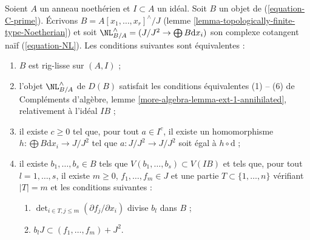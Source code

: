 \begin{lemma}
\label{lemma-equivalent-with-artin-smooth}
Soient $A$ un anneau noethérien et $I \subset A$ un idéal. Soit $B$ un objet
de (\ref{equation-C-prime}). Écrivons
$B = A[x_1, \ldots, x_r]^\wedge/J$
(lemme \ref{lemma-topologically-finite-type-Noetherian}) et soit
$\NL_{B/A}^\wedge = (J/J^2 \to \bigoplus B\text{d}x_i)$ son complexe
cotangent naïf (\ref{equation-NL}). Les conditions suivantes sont équivalentes :
\begin{enumerate}
\item $B$ est rig-lisse sur $(A, I)$ ;
\item l'objet $\NL_{B/A}^\wedge$ de $D(B)$ satisfait les conditions
équivalentes (1) -- (6) de Compléments d'algèbre, lemme
\ref{more-algebra-lemma-ext-1-annihilated}, relativement à l'idéal $IB$ ;
\item il existe $c \geq 0$ tel que, pour tout $a \in I^c$, il existe un
homomorphisme $h : \bigoplus B\text{d}x_i \to J/J^2$ tel que
$a : J/J^2 \to J/J^2$ soit égal à $h \circ \text{d}$ ;
\item il existe $b_1, \ldots, b_s \in B$ tels que
$V(b_1, \ldots, b_s) \subset V(IB)$ et tels que, pour tout
$l = 1, \ldots, s$, il existe $m \geq 0$, $f_1, \ldots, f_m \in J$ et une
partie $T \subset \{1, \ldots, n\}$ vérifiant $|T| = m$ et les conditions
suivantes :
\begin{enumerate}
\item $\det_{i \in T, j \leq m}(\partial f_j/ \partial x_i)$
divise $b_l$ dans $B$ ;
\item $b_l J \subset (f_1, \ldots, f_m) + J^2$.
\end{enumerate}
\end{enumerate}
\end{lemma}

